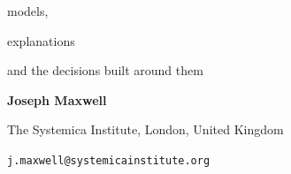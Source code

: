 \documentclass[11pt,a4paper,oneside]{report}
\begin{document}
\begin{titlepage}
\begin{center}
{models,

explanations

and the decisions built around them

\par}



\vspace{0.9cm}



{\Large

\textbf{Joseph Maxwell}

\par}



\vspace{0.18cm}



{\normalsize

The Systemica Institute, London, United Kingdom

\par}



\vspace{0.18cm}



{\small

\texttt{j.maxwell@systemicainstitute.org}

\par}



\vspace{0.95cm}









\end{center}
\end{titlepage}
\end{document}
